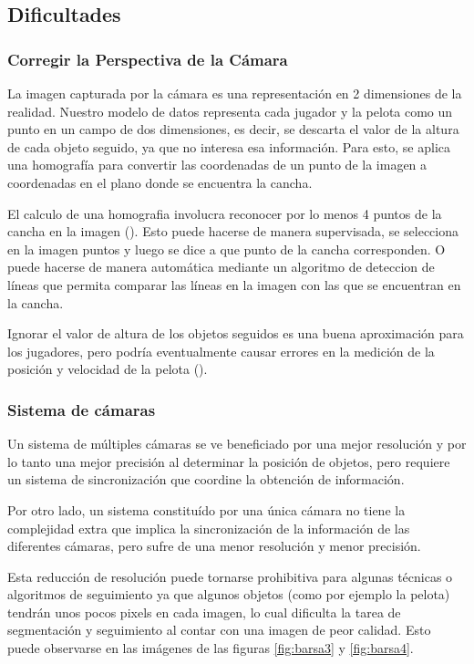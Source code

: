 \subsection{Dificultades}

\subsubsection{Corregir la Perspectiva de la Cámara}

La imagen capturada por la cámara es una representación en 2 dimensiones de
la realidad. Nuestro modelo de datos representa cada jugador y la pelota
como un punto en un campo de dos dimensiones, es decir, se descarta el valor
de la altura de cada objeto seguido, ya que no interesa esa información.
Para esto, se aplica una homografía para convertir las coordenadas de un punto de
la imagen a coordenadas en el plano donde se encuentra la cancha.

El calculo de una homografia involucra reconocer por lo menos 4 puntos de la cancha
en la imagen (\cite{homography-estimation}). Esto puede hacerse de manera supervisada, se selecciona en la imagen
puntos y luego se dice a que punto de la cancha corresponden. O puede hacerse de
manera automática mediante un algoritmo de deteccion de líneas que permita
comparar las líneas en la imagen con las que se encuentran en la cancha.

Ignorar el valor de altura de los objetos seguidos es una buena aproximación
para los jugadores, pero podría eventualmente causar errores en la medición de
la posición y velocidad de la pelota (\cite{Liu20061146}).

\subsubsection{Sistema de cámaras}

Un sistema de múltiples cámaras se ve beneficiado por una mejor resolución y
por lo tanto una mejor precisión al determinar la posición de objetos, pero
requiere un sistema de sincronización que coordine la obtención de información.

Por otro lado, un sistema constituído por una única cámara no tiene la
complejidad extra que implica la sincronización de la información de las
diferentes cámaras, pero sufre de una menor resolución y menor precisión.

Esta reducción de resolución puede tornarse prohibitiva para algunas técnicas o
algoritmos de seguimiento ya que algunos objetos (como por ejemplo la pelota)
tendrán unos pocos pixels en cada imagen, lo cual dificulta la tarea de
segmentación y seguimiento al contar con una imagen de peor calidad.  Esto
puede observarse en las imágenes de las figuras \ref{fig:barsa3} y
\ref{fig:barsa4}.

